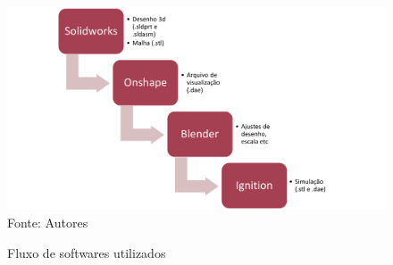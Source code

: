 \begin{figure}[h]
	\centering
	\caption[Fluxo de softwares utilizados]{Fluxo de softwares utilizados}
	\label{fig:software-flow}
	\includegraphics[width=1\linewidth]{images/software-flow}\\
	\footnotesize Fonte: Autores
\end{figure}


